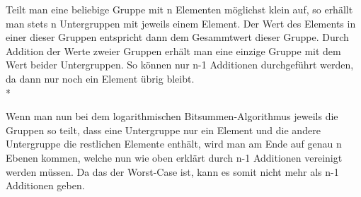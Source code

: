 \documentclass[a4paper,11pt]{article}             %
\begin{document}

Teilt man eine beliebige Gruppe mit n Elementen möglichst klein auf, so erhällt man stets n Untergruppen mit jeweils einem Element.
Der Wert des Elements in einer dieser Gruppen entspricht dann dem Gesammtwert dieser Gruppe. 
Durch Addition der Werte zweier Gruppen erhält man eine einzige Gruppe mit dem Wert beider Untergruppen.
So können nur n-1 Additionen durchgeführt werden, da dann nur noch ein Element übrig bleibt.\\*

Wenn man nun bei dem logarithmischen Bitsummen-Algorithmus jeweils die Gruppen so teilt, dass eine Untergruppe nur ein Element
und die andere Untergruppe die restlichen Elemente enthält, wird man am Ende auf genau n Ebenen kommen,
welche nun wie oben erklärt durch n-1 Additionen vereinigt werden müssen. Da das der Worst-Case ist, kann es somit nicht mehr als n-1 Additionen geben.
\end{document}
